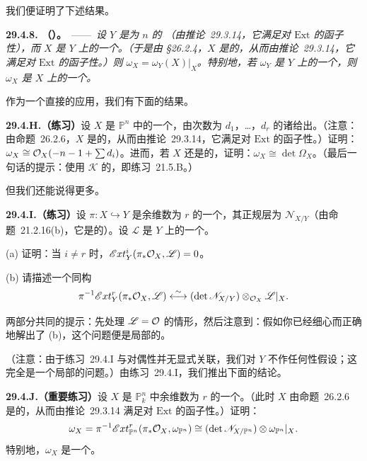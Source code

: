 我们便证明了下述结果。

\textbf{29.4.8. \trhProposition（\trAdjunctionFormula）。}\ ——\ \emph{设 $Y$ 是\trPureDimension{}为 $n$ 的 \trCM{} \trProjectiveScheme（由\mbox{推论~29.3.14}，它满足对 $\mathrm{Ext}$ 的函子性\trSerreDuality），而 $X$ 是 $Y$ 上的一个\trEffectiveCartierDivisor。（于是由 \S26.2.4，$X$ 是\trCM{}的，从而由\mbox{推论~29.3.14}，它满足对 $\mathrm{Ext}$ 的函子性\trSerreDuality。）则 $\omega_X=\omega_Y(X)|_X$。特别地，若 $\omega_Y$ 是 $Y$ 上的一个\trInvertibleSheaf，则 $\omega_X$ 是 $X$ 上的一个\trInvertibleSheaf。}

作为一个直接的应用，我们有下面的结果。

\textbf{29.4.H.（练习）}\quad 设 $X$ 是 $\mathbb{P}^n$ 中的一个\trCompleteIntersection，由次数为 $d_1$，…，$d_r$ 的诸\trHypersurface{}给出。（注意：由\mbox{命题~26.2.6}，$X$ 是\trCM{}的，从而由\mbox{推论~29.3.14}，它满足对 $\mathrm{Ext}$ 的函子性\trSerreDuality。）证明：$\omega_X\cong\mathcal{O}_X(-n-1+\sum d_i)$。进而，若 $X$ 还是\trSmooth{}的，证明：$\omega_X\cong\det\Omega_X$。（最后一句话的提示：使用 $\mathscr{K}$ 的\trAdjunctionFormula，即\mbox{练习~21.5.B}。）

但我们还能说得更多。

\textbf{29.4.I.（练习）}\quad 设 $\pi\colon X\hookrightarrow Y$ 是余维数为 $r$ 的一个\trRegularEmbedding，其正规层为 $\mathscr{N}_{X/Y}$（由\mbox{命题~21.2.16(b)}，它是\trLocallyFree{}的）。设 $\mathscr{L}$ 是 $Y$ 上的一个\trInvertibleSheaf。

(a) 证明：当 $i\ne r$ 时，$\mathscr{E}xt^i_Y(\pi_*\mathcal{O}_X,\mathscr{L})=0$。

(b) 请描述一个\trCanonical{}同构
\[
\pi^{-1}\mathscr{E}xt^r_Y(\pi_*\mathcal{O}_X,\mathscr{L})\overset{\sim}{\longleftrightarrow}(\det\mathscr{N}_{X/Y})\otimes_{\mathcal{O}_X}\mathscr{L}|_X.
\]

两部分共同的提示：先处理 $\mathscr{L}=\mathcal{O}$ 的情形，然后注意到：假如你已经细心而正确地解出了 (b)，这个问题便是局部的。

（注意：由于\mbox{练习~29.4.I} 与对偶性并无显式关联，我们对 $Y$ 不作任何\trProjective{}性假设；这完全是一个局部的问题。）由\mbox{练习~29.4.I}，我们推出下面的结论。

\textbf{29.4.J.（重要练习）}\quad 设 $X$ 是 $\mathbb{P}^n_k$ 中余维数为 $r$ 的一个\trRegularEmbedding。（此时 $X$ 由\mbox{命题~26.2.6} 是\trCM{}的，从而由\mbox{推论~29.3.14} 满足对 $\mathrm{Ext}$ 的函子性\trSerreDuality。）证明：
\[
\omega_X=\pi^{-1}\mathscr{E}xt^r_{\mathbb{P}^n}(\pi_*\mathcal{O}_X,\omega_{\mathbb{P}^n})\cong(\det\mathscr{N}_{X/\mathbb{P}^n})\otimes\omega_{\mathbb{P}^n}|_X.
\]
特别地，$\omega_X$ 是一个\trInvertibleSheaf。

